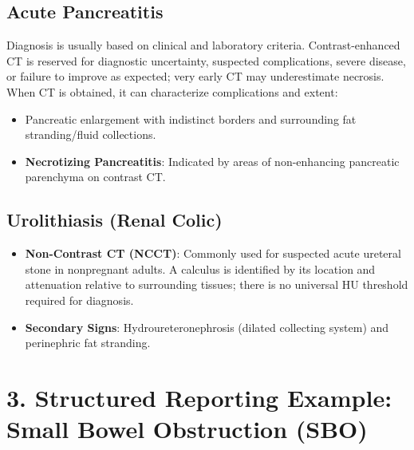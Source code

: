 \subsection*{Acute Pancreatitis}
Diagnosis is usually based on clinical and laboratory criteria. Contrast-enhanced CT is reserved for diagnostic uncertainty, suspected complications, severe disease, or failure to improve as expected; very early CT may underestimate necrosis. When CT is obtained, it can characterize complications and extent:
\begin{itemize}
    \item Pancreatic enlargement with indistinct borders and surrounding fat stranding/fluid collections.
    \item \textbf{Necrotizing Pancreatitis}: Indicated by areas of non-enhancing pancreatic parenchyma on contrast CT.
\end{itemize}

\subsection*{Urolithiasis (Renal Colic)}
\begin{itemize}
    \item \textbf{Non-Contrast CT (NCCT)}: Commonly used for suspected acute ureteral stone in nonpregnant adults. A calculus is identified by its location and attenuation relative to surrounding tissues; there is no universal HU threshold required for diagnosis.
    \item \textbf{Secondary Signs}: Hydroureteronephrosis (dilated collecting system) and perinephric fat stranding.
\end{itemize}


\section*{3. Structured Reporting Example: Small Bowel Obstruction (SBO)}


